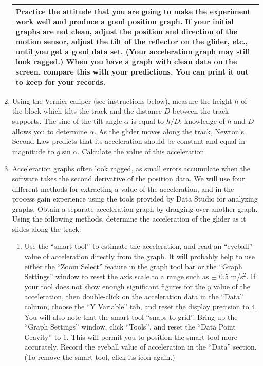 \begin{enumerate}[start=6]
\begin{center}
\begin{tabular}{|p{14cm}|}
\hline\tstrut
Practice the attitude that you are going to make the experiment work well and produce a good position graph.  If your initial graphs are not clean, adjust the position and direction of the motion sensor, adjust the tilt of the reflector on the glider, etc., until you get a good data set.  (Your acceleration graph may still look ragged.)  When you have a graph with clean data on the screen, compare this with your predictions.  You can print it out to keep for your records.  \bstrut\\
\hline
\end{tabular}
\end{center}

\item Using the Vernier caliper (see instructions below), measure the height \(h\) of the block which tilts the track and the distance \(D\) between the track supports.  The sine of the tilt angle \(\alpha\) is equal to \(h/D\); knowledge of \(h\) and \(D\) allows you to determine \(\alpha\).  As the glider moves along the track, Newton's Second Law predicts that its acceleration should be constant and equal in magnitude to \(g\sin\alpha\).  Calculate the value of this acceleration.

\item Acceleration graphs often look ragged, as small errors accumulate when the software takes the second derivative of the position data.  We will use four different methods for extracting a value of the acceleration, and in the process gain experience using the tools provided by Data Studio for analyzing graphs.  Obtain a separate acceleration graph by dragging over another graph.  Using the following methods, determine the acceleration of the glider as it slides along the track:

\begin{enumerate}[label=\alph*.]

\item Use the ``smart tool'' to estimate the acceleration, and read an ``eyeball'' value of acceleration directly from the graph.  It will probably help to use either the ``Zoom Select'' feature in the graph tool bar or the ``Graph Settings'' window to reset the axis scale to a range such as \(\pm\) 0.5 m/s\(^{2}\).  If your tool does not show enough significant figures for the \(y\) value of the acceleration, then double-click on the acceleration data in the ``Data'' column, choose the ``Y Variable'' tab, and reset the display precision to 4.  You will also note that the smart tool ``snaps to grid''.  Bring up the ``Graph Settings'' window, click ``Tools'', and reset the ``Data Point Gravity'' to 1.  This will permit you to position the smart tool more accurately.  Record the eyeball value of acceleration in the ``Data'' section.  (To remove the smart tool, click its icon again.)


\end{enumerate}
\end{enumerate}
